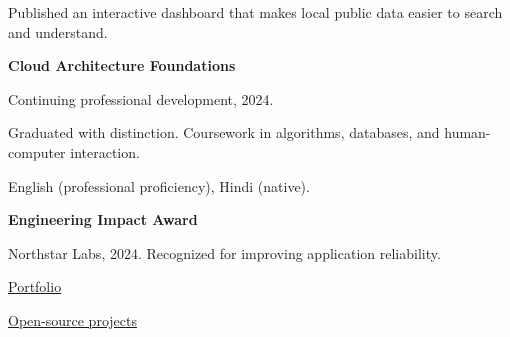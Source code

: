 \begin{resumecolumns}
\begin{highlights}
  \item Published an interactive dashboard that makes local public data
    easier to search and understand.
\end{highlights}

\textbf{Cloud Architecture Foundations}\par
Continuing professional development, 2024.

%
%

\resumesidebar

\vspace{2pt}
Graduated with distinction. Coursework in algorithms, databases, and
human-computer interaction.


English (professional proficiency), Hindi (native).

\textbf{Engineering Impact Award}\par
Northstar Labs, 2024. Recognized for improving application reliability.

\href{https://example.com}{Portfolio}\par
\href{https://example.com/github}{Open-source projects}
\end{resumecolumns}
